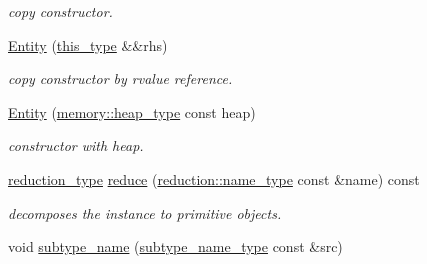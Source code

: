 \begin{DoxyCompactItemize}
\begin{DoxyCompactList}\small\item\em copy constructor. \end{DoxyCompactList}\item 
\hypertarget{classhryky_1_1http_1_1header_1_1media__type_1_1_entity_a5a1ec3f7550fe9d41c930e479c2b9ceb}{\hyperlink{classhryky_1_1http_1_1header_1_1media__type_1_1_entity_a5a1ec3f7550fe9d41c930e479c2b9ceb}{Entity} (\hyperlink{classhryky_1_1http_1_1header_1_1media__type_1_1_entity_ac2b17061949e39ad285a8517833ec4f4}{this\-\_\-type} \&\&rhs)}\label{classhryky_1_1http_1_1header_1_1media__type_1_1_entity_a5a1ec3f7550fe9d41c930e479c2b9ceb}

\begin{DoxyCompactList}\small\item\em copy constructor by rvalue reference. \end{DoxyCompactList}\item 
\hypertarget{classhryky_1_1http_1_1header_1_1media__type_1_1_entity_aa7e3ad997a8a9e5ba9209cd23f1c2387}{\hyperlink{classhryky_1_1http_1_1header_1_1media__type_1_1_entity_aa7e3ad997a8a9e5ba9209cd23f1c2387}{Entity} (\hyperlink{classhryky_1_1memory_1_1heap_1_1_base}{memory\-::heap\-\_\-type} const heap)}\label{classhryky_1_1http_1_1header_1_1media__type_1_1_entity_aa7e3ad997a8a9e5ba9209cd23f1c2387}

\begin{DoxyCompactList}\small\item\em constructor with heap. \end{DoxyCompactList}\item 
\hypertarget{classhryky_1_1http_1_1header_1_1media__type_1_1_entity_afd5e4bc516125e7fca889ac34efc67d6}{\hyperlink{namespacehryky_a343a9a4c36a586be5c2693156200eadc}{reduction\-\_\-type} \hyperlink{classhryky_1_1http_1_1header_1_1media__type_1_1_entity_afd5e4bc516125e7fca889ac34efc67d6}{reduce} (\hyperlink{namespacehryky_1_1reduction_ac686c30a4c8d196bbd0f05629a6b921f}{reduction\-::name\-\_\-type} const \&name) const }\label{classhryky_1_1http_1_1header_1_1media__type_1_1_entity_afd5e4bc516125e7fca889ac34efc67d6}

\begin{DoxyCompactList}\small\item\em decomposes the instance to primitive objects. \end{DoxyCompactList}\item 
\hypertarget{classhryky_1_1http_1_1header_1_1media__type_1_1_entity_a1f9496a572a79e78eb2617ef3dc4231e}{void \hyperlink{classhryky_1_1http_1_1header_1_1media__type_1_1_entity_a1f9496a572a79e78eb2617ef3dc4231e}{subtype\-\_\-name} (\hyperlink{classhryky_1_1_vector}{subtype\-\_\-name\-\_\-type} const \&src)}\label{classhryky_1_1http_1_1header_1_1media__type_1_1_entity_a1f9496a572a79e78eb2617ef3dc4231e}


\end{DoxyCompactItemize}

